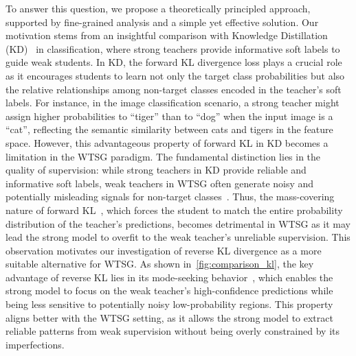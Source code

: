 To answer this question, we propose a theoretically principled approach, supported by fine-grained analysis and a simple yet effective solution.
Our motivation stems from an insightful comparison with Knowledge Distillation (KD)~\citep{hinton2015distilling} in classification, where strong teachers provide informative soft labels to guide weak students. 
In KD, the forward KL divergence loss plays a crucial role as it encourages students to learn not only the target class probabilities but also the relative relationships among non-target classes encoded in the teacher's soft labels.
For instance, in the image classification scenario, a strong teacher might assign higher probabilities to ``tiger'' than to ``dog'' when the input image is a ``cat'', reflecting the semantic similarity between cats and tigers in the feature space.
However, this advantageous property of forward KL in KD becomes a limitation in the WTSG paradigm.
The fundamental distinction lies in the quality of supervision: while strong teachers in KD provide reliable and informative soft labels, weak teachers in WTSG often generate noisy and potentially misleading signals for non-target classes~\citep{burns2023weak}.
Thus, the mass-covering nature of forward KL~\citep{jerfel2021variational,sun2024inverse}, which forces the student to match the entire probability distribution of the teacher's predictions, becomes detrimental in WTSG as it may lead the strong model to overfit to the weak teacher's unreliable supervision. This observation motivates our investigation of reverse KL divergence as a more suitable alternative for WTSG.
As shown in~\cref{fig:comparison_kl}, the key advantage of reverse KL lies in its mode-seeking behavior~\citep{minka2005divergence,ji2023language}, which enables the strong model to focus on the weak teacher's high-confidence predictions while being less sensitive to potentially noisy low-probability regions.
This property aligns better with the WTSG setting, as it allows the strong model to extract reliable patterns from weak supervision without being overly constrained by its imperfections. 

